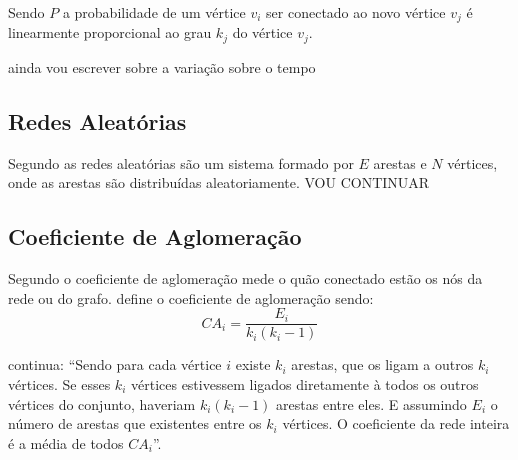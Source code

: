 Sendo $P$ a probabilidade de um vértice $v_i$ ser conectado ao novo vértice $v_j$ é linearmente proporcional ao grau $k_j$ do vértice $v_j$.

{\Huge ainda vou escrever sobre a variação sobre o tempo}
 
     
\subsection{Redes Aleatórias}
Segundo \citet{Viana2007} as redes aleatórias são um sistema formado por $E$ arestas e $N$ vértices, onde as arestas são distribuídas aleatoriamente. 
{\Huge VOU CONTINUAR}
 
\subsection{Coeficiente de Aglomeração}
\label{subsec:coeficienteaglomeracao}
Segundo \citet{Viana2007} o coeficiente de aglomeração mede o quão conectado estão os nós da rede ou do grafo. \citet{Antiqueira2005}  define o coeficiente de aglomeração sendo:\[CA_i = \frac{E_i}{k_i(k_i-1)}\]

\citet{Antiqueira2005}  continua: “Sendo para cada vértice \(i\) existe \(k_i\) arestas, que os ligam a outros \(k_i\) vértices. Se esses \(k_i\) vértices estivessem ligados diretamente à todos os outros vértices do conjunto, haveriam \(k_i(k_i- 1)\) arestas entre eles. E assumindo \(E_i\) o número de arestas que existentes entre os \(k_i\) vértices.	O coeficiente da rede inteira é a média de todos \(CA_i\)”.

